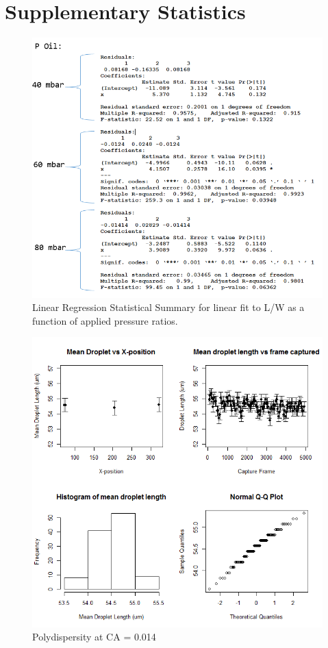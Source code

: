 \chapter{Supplementary Statistics}

\begin{figure}[H]
\centering 
\includegraphics[width=01.0\columnwidth]{lmstats.PNG} 
\caption[Linear Regression Statistical Summary]{Linear Regression Statistical Summary for linear fit to L/W as a function of applied pressure ratios.} 
\label{fig:lmstats} 
\end{figure}

\begin{figure}[H]
\centering 
\includegraphics[width=01.0\columnwidth]{2_poly.PNG} 
\caption[Polydispersity at CA = 0.014]{Polydispersity at CA = 0.014} 
\label{fig:2_poly} 
\end{figure}

